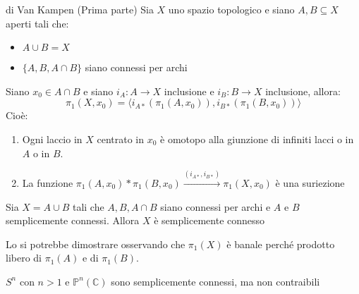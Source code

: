 \documentclass[11pt,a4paper,twoside]{article}
\theoremstyle{definition}
\begin{document}
\begin{thm}{di Van Kampen (Prima parte)}{}{}\label{VK}
	Sia $X$ uno spazio topologico e siano $A,B\subseteq X$ aperti tali che:
	\begin{itemize}
		\item $A\cup B = X$
		\item $\{A, B, A\cap B\}$ siano connessi per archi
	\end{itemize}
	Siano $x_0 \in A \cap B$ e siano $i_A:A \to X$ inclusione e  $i_B:B \to X$ inclusione, allora:
	\[ \pi_1(X, x_0) = \langle i_{A*}(\pi_1(A, x_0)), i_{B*}(\pi_1(B, x_0)) \rangle \]
	Cioè:
	\begin{enumerate}
		\item Ogni laccio in $X$ centrato in $x_0$ è omotopo alla giunzione di infiniti lacci o in $A$ o in $B$.
		\item La funzione $\pi_1(A, x_0)*\pi_1(B, x_0) \xrightarrow{(i_{A*}, i_{B*})} \pi_1(X,x_0)$ è una suriezione
	\end{enumerate}
\end{thm}

\begin{cor}{}{}
	Sia $X = A \cup B$ tali che $A, B, A\cap B$ siano connessi per archi e $A$ e $B$ semplicemente connessi. Allora $X$ è semplicemente connesso
\end{cor}

Lo si potrebbe dimostrare osservando che $\pi_1(X)$ è banale perché prodotto libero di $\pi_1(A)$ e di $\pi_1(B)$.

\begin{cor}{}{}
	$S^n$ con $n>1$ e $\mathbb P^n(\mathbb C)$ sono semplicemente connessi, ma non contraibili
\end{cor}
\end{document}
